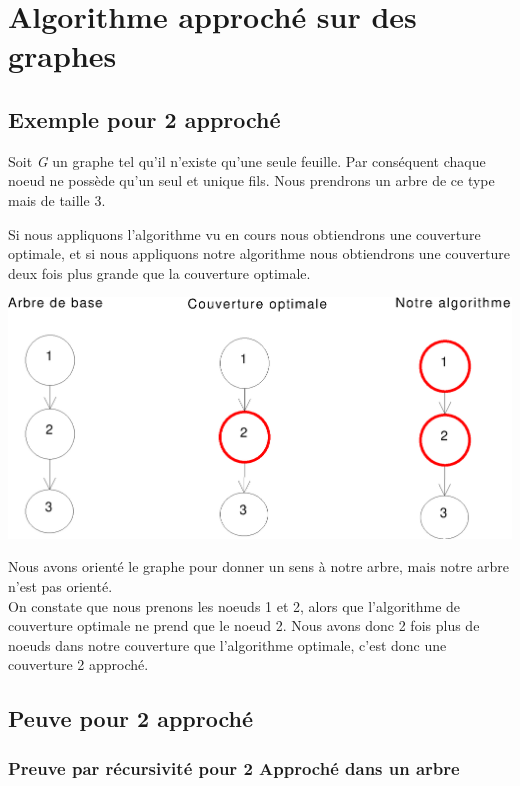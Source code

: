 \section{Algorithme approch\'e sur des graphes}

\subsection{Exemple pour 2 approch\'e}

Soit \textit{G} un graphe tel qu'il n'existe qu'une seule feuille. Par
cons\'equent chaque noeud ne poss\`ede qu'un seul et unique fils. Nous
prendrons un arbre de ce type mais de taille 3.

Si nous appliquons l'algorithme vu en cours nous obtiendrons une
couverture optimale, et si nous appliquons notre algorithme nous
obtiendrons une couverture deux fois plus grande que la couverture optimale.


\bigskip


\includegraphics[width=15cm]{arbredoublecouverture}

Nous avons orient\'e le graphe pour donner un sens \`a notre arbre,
mais notre arbre n'est pas orient\'e.\\
On constate que nous prenons les noeuds 1 et 2, alors que l'algorithme
de couverture optimale ne prend que le noeud 2. Nous avons donc 2 fois
plus de noeuds dans notre couverture que l'algorithme optimale, c'est
donc une couverture 2 approch\'e.

\subsection{Peuve pour 2 approch\'e}

\subsubsection{Preuve par r\'ecursivit\'e pour 2 Approch\'e dans un arbre}

